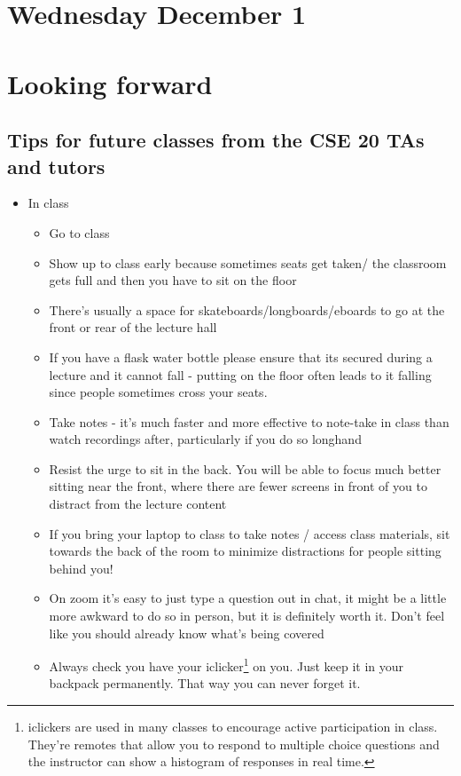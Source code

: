 \documentclass[12pt, oneside]{article}
\begin{document}
\section*{Wednesday December 1}

\newpage

\section*{Looking forward}

\subsection*{Tips for future classes from the CSE 20 TAs and tutors}
\begin{itemize}
\item In class
\begin{itemize}
\item Go to class
\item Show up to class early because sometimes seats get taken/ the classroom gets full and then you have to sit on the floor
\item There's usually a space for skateboards/longboards/eboards to go at the front or rear of the lecture hall 
\item If you have a flask water bottle please ensure that its secured during a lecture and it cannot fall - putting on the floor often leads to it falling since people sometimes cross your seats.
\item Take notes - it's much faster and more effective to note-take in class than watch recordings after, particularly if you do so longhand
\item Resist the urge to sit in the back. You will be able to focus much better sitting near the front, where there are fewer screens in front of you to distract from the lecture content
\item If you bring your laptop to class to take notes / access class materials, sit towards the back of the room to minimize distractions for people sitting behind you!
\item On zoom it's easy to just type a question out in chat, it might be a little more awkward to do so in person, but it is definitely worth it. Don't feel like you should already know what's being covered
\item Always check you have your iclicker\footnote{iclickers are used in many classes to encourage active participation in class. They're remotes that allow you to respond to multiple choice questions and the instructor can show a histogram of responses in real time.} on you. Just keep it in your backpack permanently. That way you can never forget it. 

\end{itemize}
\end{itemize}
\end{document}
